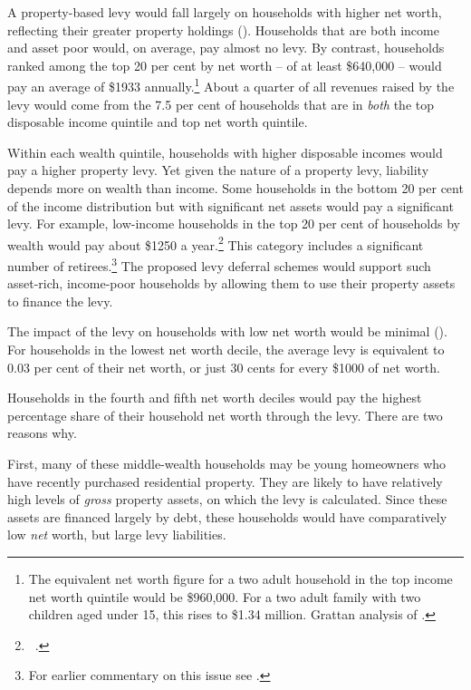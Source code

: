 \documentclass[twoside,english]{grattanBudgetRepairb5portrait}
\begin{document}
A property-based levy would fall largely on households with higher net worth, reflecting their greater property holdings (). Households that are both income and asset poor would, on average, pay almost no levy. By contrast, households ranked among the top 20 per cent by net worth – of at least \$640,000 – would pay an average of \$1933 annually.\footnote{The equivalent net worth figure for a two adult household in the top income net worth quintile would be \$960,000. For a two adult family with two children aged under 15, this rises to \$1.34 million. Grattan analysis of \textcites{ABS2013t}{ABS2014e}.}  About a quarter of all revenues raised by the levy would come from the 7.5 per cent of households that are in \emph{both} the top disposable income quintile and top net worth quintile. 

Within each wealth quintile, households with higher disposable incomes would pay a higher property levy. Yet given the nature of a property levy, liability depends more on wealth than income. Some households in the bottom 20 per cent of the income distribution but with significant net assets would pay a significant levy. For example, low-income households in the top 20 per cent of households by wealth would pay about \$1250 a year.\footnote{\gao\ \textcites{ABS2013t}{ABS2014e}.}  This category includes a significant number of retirees.\footnote{For earlier commentary on this issue see \textcites[][11]{HardingWarren1999}[][156--158]{productivity2008assessing}.}  The proposed levy deferral schemes would support such asset-rich, income-poor households by allowing them to use their property assets to finance the levy.

The impact of the levy on households with low net worth would be minimal (). For households in the lowest net worth decile, the average levy is equivalent to 0.03 per cent of their net worth, or just 30 cents for every \$1000 of net worth.  



Households in the fourth and fifth net worth deciles would pay the highest percentage share of their household net worth through the levy. There are two reasons why.

First, many of these middle-wealth households may be young homeowners who have recently purchased residential property. They are likely to have relatively high levels of \emph{gross} property assets, on which the levy is calculated. Since these assets are financed largely by debt, these households would have comparatively low \emph{net} worth, but large levy liabilities. 
\end{document}
